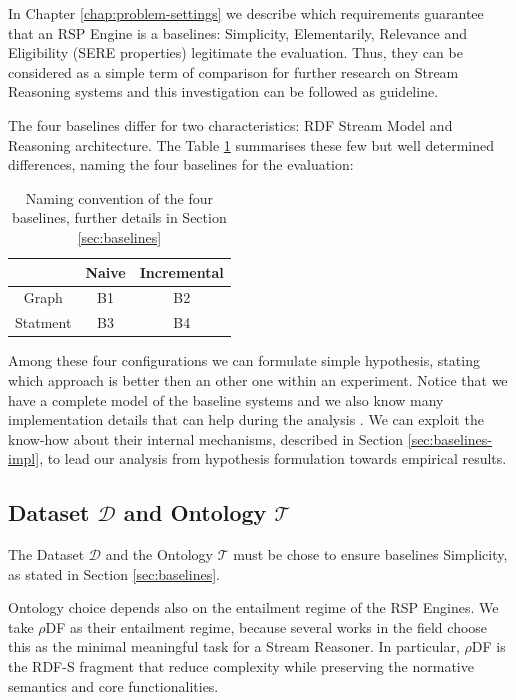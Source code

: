 In Chapter \ref{chap:problem-settings} we describe which requirements guarantee that an RSP Engine is a baselines: Simplicity, Elementarily, Relevance and Eligibility (SERE properties) legitimate the evaluation. Thus, they can be considered as a simple term of comparison for further research on Stream Reasoning systems and this investigation can be followed as guideline.
 
The four baselines differ for two characteristics: RDF Stream Model and Reasoning architecture. The Table \ref{tab:baselines-names} summarises these few but well determined differences, naming the four baselines for the evaluation:\begin{table}[htb]
\scriptsize
\centering
\begin{tabular}{c|cc} %
	\hline
         & Naive & Incremental\\
	\hline
	Graph        &  B1      & B2\\
	Statment   &  B3   & B4\\
	\hline %
\end{tabular}
\caption{Naming convention of the four baselines, further details in Section \ref{sec:baselines}}
\label{tab:baselines-names}
\end{table}

\noindent Among these four configurations we can formulate simple hypothesis, stating which approach is better then an other one within an experiment. Notice that we have a complete model of the baseline systems and we also know many implementation details that can help during the analysis . We can exploit the know-how about their internal mechanisms, described in Section \ref{sec:baselines-impl}, to lead our analysis from hypothesis formulation towards empirical results. 

\subsection{Dataset $\mathcal{D}$ and Ontology $\mathcal{T}$}\label{sec:dataset}

\noindent The Dataset  $\mathcal{D}$ and the Ontology $\mathcal{T}$ must be chose to ensure baselines Simplicity, as stated in Section \ref{sec:baselines}. 

Ontology choice depends also on the entailment regime of the RSP Engines. We take $\rho$DF  \cite{DBLP:conf/esws/MunozPG07} as their entailment regime, because several works in the field \cite{DBLP:conf/semweb/UrbaniMJHB13} choose this as the minimal meaningful task for a Stream Reasoner. In particular, $\rho$DF is the RDF-S fragment that reduce complexity while preserving the normative semantics and core functionalities.

